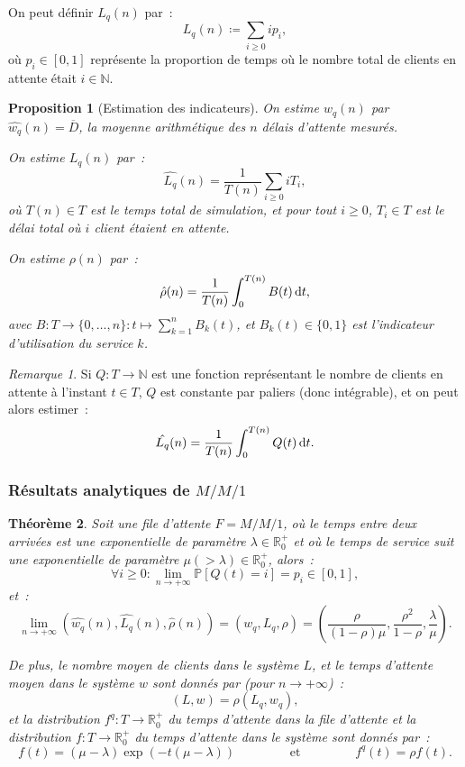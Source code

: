 \documentclass{article}
\newtheorem{thm}{Théorème}[section]
\newtheorem{prp}[thm]{Proposition}
\theoremstyle{definition}
\theoremstyle{remark}
\newtheorem*{rmq}{Remarque}
\renewcommand{\P}{\mathbb P}
\newcommand{\N}{\mathbb N}
\newcommand{\R}{\mathbb R}
\begin{document}
	On peut définir $L_q(n)$ par~:
	\[L_q(n) \coloneqq \sum_{i \geq 0}ip_i,\]
	où $p_i \in [0, 1]$ représente la proportion de temps où le nombre total de clients en attente était $i \in \N$.

	\begin{prp}[Estimation des indicateurs] On estime $w_q(n)$ par $\hat {w_q}(n) = \overline D$, la moyenne arithmétique des $n$ délais d'attente mesurés.

	On estime $L_q(n)$ par~:
	\[\hat {L_q}(n) = \frac 1{T(n)} \sum_{i \geq 0}iT_i,\]
	où $T(n) \in T$ est le temps total de simulation, et pour tout $i \geq 0$, $T_i \in T$ est le délai total où $i$ client étaient en attente.

	On estime $\rho(n)$ par~:
	\[\hat \rho(n) = \frac 1{T(n)}\int_0^{T(n)}B(t)\dif t,\]
	avec $B : T \to \{0, \ldots, n\} : t \mapsto \sum_{k=1}^nB_k(t)$, et $B_k(t) \in \{0, 1\}$ est l'indicateur d'utilisation du service $k$.
	\end{prp}

	\begin{rmq} Si $Q : T \to \N$ est une fonction représentant le nombre de clients en attente à l'instant $t \in T$, $Q$ est constante par paliers (donc
	intégrable), et on peut alors estimer~:
	\[\hat {L_q}(n) = \frac 1{T(n)}\int_0^{T(n)}Q(t)\dif t.\]
	\end{rmq}

		\subsubsection{Résultats analytiques de $M/M/1$}

	\begin{thm} Soit une file d'attente $F = M/M/1$, où le temps entre deux arrivées est une exponentielle de paramètre $\lambda \in \R_0^+$ et où le temps de
	service suit une exponentielle de paramètre $\mu (> \lambda) \in \R_0^+$, alors~:
	\[\forall i \geq 0 : \lim_{n \to +\infty}\P[Q(t)=i] = p_i \in [0, 1],\]
	et~:
	\[\lim_{n \to +\infty}\left(\hat {w_q}(n), \hat {L_q}(n), \hat \rho(n)\right) = (w_q, L_q, \rho)
		= \left(\frac \rho{(1-\rho)\mu}, \frac {\rho^2}{1-\rho}, \frac \lambda\mu\right).\]

	De plus, le nombre moyen de clients dans le système $L$, et le temps d'attente moyen dans le système $w$ sont donnés par (pour $n \to +\infty$)~:
	\[(L, w) = \rho(L_q, w_q),\]
	et la distribution $f^q : T \to \R^+_0$ du temps d'attente dans la file d'attente et la distribution $f : T \to \R^+_0$ du temps d'attente dans le système
	sont donnés par~:
	\[f(t) = (\mu-\lambda)\exp(-t(\mu-\lambda)) \qquad\qquad \text{ et } \qquad\qquad f^q(t) = \rho f(t).\]
	\end{thm}
\end{document}
